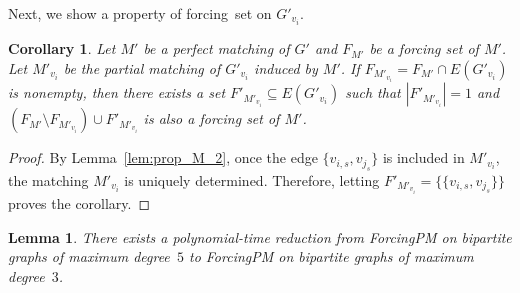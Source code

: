 \documentclass[a4paper,10pt]{article}
\newtheorem{lemma}{Lemma}
\newtheorem{corollary}{Corollary}
\newcommand{\FS}{\rm forcing~set}
\newcommand{\FPM}{\sc ForcingPM} %
\begin{document}
Next, we show a property of {\FS} on $G'_{v_i}$.

\begin{corollary}\label{cor:forcingset}
    Let $M'$ be a perfect matching of $G'$ and $F_{M'}$ be a forcing set of $M'$.
    Let $M'_{v_i}$ be the partial matching of $G'_{v_i}$ induced by $M'$.
    If $F_{M'_{v_i}} = F_{M'} \cap E(G'_{v_i})$ is nonempty, then there exists a set $F'_{M'_{v_i}} \subseteq E(G'_{v_i})$ such that $|F'_{M'_{v_i}}|=1$ and $(F_{M'} \setminus F_{M'_{v_i}})\cup F'_{M'_{v_i}}$ is also a forcing set of $M'$.
\end{corollary}
 
\begin{proof}
    By Lemma~\ref{lem:prop_M_2}, once the edge $\{v_{i,s}, v_{j_s}\}$ is included in $M'_{v_i}$, the matching $M'_{v_i}$ is uniquely determined.
    Therefore, letting $F'_{M'_{v_i}} = \{\{{v_{i,s}, v_{j_s}}\}\}$ proves the corollary.
\end{proof}

\begin{lemma} \label{FPM53_reduction}
    There exists a polynomial-time reduction from {\FPM} on bipartite graphs of maximum degree~$5$ to {\FPM} on bipartite graphs of maximum degree~$3$.
\end{lemma}
\end{document}
